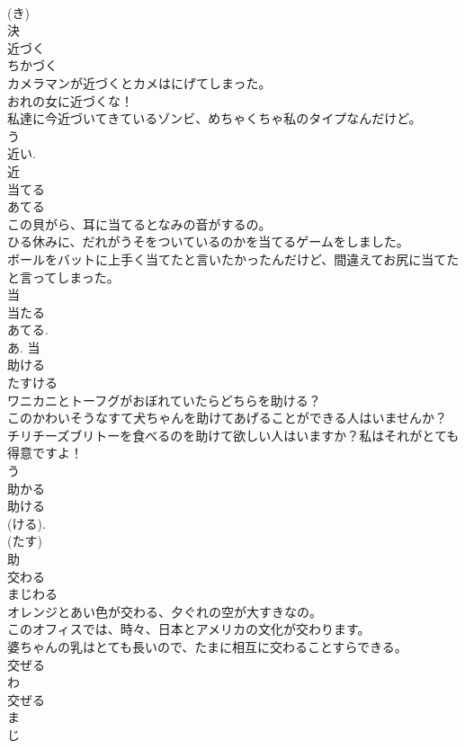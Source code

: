\documentclass[8pt]{extreport}
\begin{document}
\begin{CJK}{UTF8}{min}
\\	(き) 
\\	決	
\\	近づく	
\\	ちかづく	
\\	カメラマンが近づくとカメはにげてしまった。	
\\	おれの女に近づくな！	
\\	私達に今近づいてきているゾンビ、めちゃくちゃ私のタイプなんだけど。	
\\	う 
\\	近い. 
\\	近	
\\	当てる	
\\	あてる	
\\	この貝がら、耳に当てるとなみの音がするの。	
\\	ひる休みに、だれがうそをついているのかを当てるゲームをしました。	
\\	ボールをバットに上手く当てたと言いたかったんだけど、間違えてお尻に当てたと言ってしまった。	
\\	当 
\\	当たる 
\\	あてる. 
\\	あ.	当	
\\	助ける	
\\	たすける	
\\	ワニカニとトーフグがおぼれていたらどちらを助ける？	
\\	このかわいそうなすて犬ちゃんを助けてあげることができる人はいませんか？	
\\	チリチーズブリトーを食べるのを助けて欲しい人はいますか？私はそれがとても得意ですよ！	
\\	う 
\\	助かる 
\\	助ける 
\\	(ける).
\\	(たす) 
\\	助	
\\	交わる	
\\	まじわる	
\\	オレンジとあい色が交わる、夕ぐれの空が大すきなの。	
\\	このオフィスでは、時々、日本とアメリカの文化が交わります。	
\\	婆ちゃんの乳はとても長いので、たまに相互に交わることすらできる。	
\\	交ぜる 
\\	わ 
\\	交ぜる 
\\	ま 
\\	じ 

\end{CJK}
\end{document}
